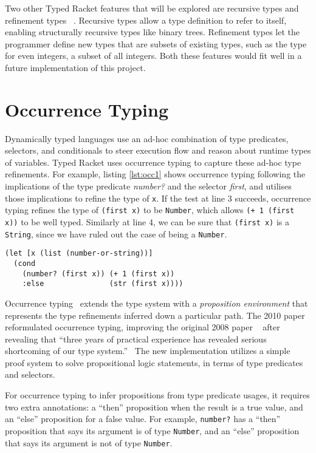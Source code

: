 Two other Typed Racket features that will be explored are recursive types and refinement types  
~\cite{Tob10}. Recursive types allow a type definition to refer to itself, enabling structurally
recursive types like binary trees. Refinement types let the programmer define
new types that are subsets of existing types, such as the type for even integers, a subset of all integers.
Both these features would fit well in a future implementation of this project.

\section{Occurrence Typing}
\label{sec:OccurrenceTyping}

Dynamically typed languages use an ad-hoc combination of type predicates,
selectors, and conditionals to steer execution flow and reason about runtime types of variables.
Typed Racket uses occurrence typing to capture these ad-hoc type refinements.
For example, listing \ref{lst:occ1} shows occurrence typing following the implications 
of the type predicate \emph{number?} and the selector \emph{first}, and utilises those implications to refine
the type of \lstinline|x|. If the test at line 3 succeeds, occurrence typing refines the
type of \lstinline|(first x)| to be \lstinline|Number|, which allows \lstinline|(+ 1 (first x))|
to be well typed. Similarly at line 4, we can be sure that \lstinline|(first x)| is
a \lstinline|String|, since we have ruled out the case of being a \lstinline|Number|.

\begin{lstlisting}[caption=A well typed form utilising occurrence typing with Clojure syntax, label=lst:occ1]
(let [x (list (number-or-string))]
  (cond 
    (number? (first x)) (+ 1 (first x))
    :else               (str (first x))))
\end{lstlisting}

Occurrence typing~\cite{TF08,TF10} extends the type 
system with a \emph{proposition environment} that represents 
the type refinements inferred down a particular path.
The 2010 paper~\cite{TF10}
reformulated occurrence typing, improving the original 2008 paper
~\cite{TF08}
after revealing that ``three years of practical experience has revealed
serious shortcoming of our type system.''~\cite{TF10}
The new implementation utilizes a simple proof system to solve
propositional logic statements, in terms of type predicates and selectors.

For occurrence typing to infer propositions from type predicate usages, it requires 
two extra annotations: a ``then'' proposition
when the result is a true value, and an ``else'' proposition for a false value.
For example, \lstinline|number?| has a ``then'' proposition that says its argument
is of type \lstinline|Number|, and an ``else'' proposition that says its argument is not of type \lstinline|Number|.


